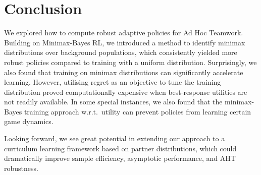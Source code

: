 \section{Conclusion}

We explored how to compute robust adaptive policies for Ad Hoc Teamwork. Building on Minimax-Bayes RL, we introduced a method to identify minimax distributions over background populations, which consistently yielded more robust policies compared to training with a uniform distribution. Surprisingly, we also found that training on minimax distributions can significantly accelerate learning.
However, utilising regret as an objective to tune the training distribution proved computationally expensive when best-response utilities are not readily available. In some special instances, we also found that the minimax-Bayes training approach w.r.t.\ utility can prevent policies from learning certain game dynamics.  

Looking forward, we see great potential in extending our approach to a curriculum learning framework based on partner distributions, which could dramatically improve sample efficiency, asymptotic performance, and AHT robustness. 




% 
%
